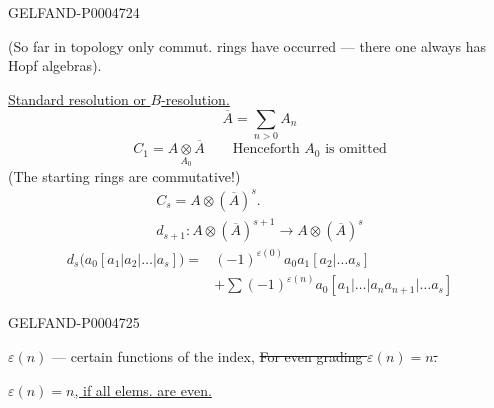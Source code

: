 \begin{GelfandAdjacentEvidence}{GELFAND-P000472}{4}

(So far in topology only commut. rings have occurred — there one always has Hopf algebras).

\uline{Standard resolution or \mbox{$B$}-resolution.}
\[
\overline A=\sum_{n>0}A_n
\]
\[
C_1=A\underset{A_0}{\otimes}\overline A
\qquad\text{Henceforth }A_0\text{ is omitted}
\]
(The starting rings are commutative!)
\[
\begin{gathered}
C_s=A\otimes(\overline A)^s.\\
d_{s+1}\colon A\otimes(\overline A)^{s+1}
\longrightarrow A\otimes(\overline A)^s
\end{gathered}
\]
\[
\begin{aligned}
d_s\bigl(a_0[a_1|a_2|\ldots|a_s]\bigr)
={}&(-1)^{\varepsilon(0)}a_0a_1[a_2|\ldots a_s]\\
 &+\sum(-1)^{\varepsilon(n)}a_0[a_1|\ldots|a_na_{n+1}|\ldots a_s]
\end{aligned}
\]
\end{GelfandAdjacentEvidence}
\begin{GelfandAdjacentEvidence}{GELFAND-P000472}{5}


$\varepsilon(n)$ — certain functions of the index,
\sout{For even grading \mbox{$\varepsilon(n)=n$}.}
\par\uline{\mbox{$\varepsilon(n)=n$}, if all elems. are even.}
\end{GelfandAdjacentEvidence}
